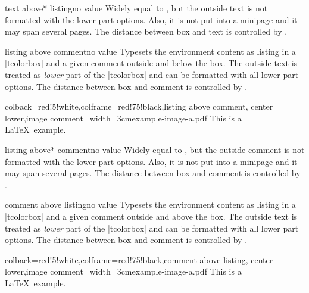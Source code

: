 \begin{docTcbKey}[][doc new=2014-11-07]{text above* listing}{}{no value}
  Widely equal to , but the outside text is
  not formatted with the lower part options.
  Also, it is not put into a minipage and it may span several pages.
  The distance between box and text is controlled by .
\end{docTcbKey}



\begin{docTcbKey}{listing above comment}{}{no value}
  Typesets the environment content as listing in a |tcolorbox|
  and a given comment outside and below the box.
  The outside text is treated as \emph{lower} part of the
  |tcolorbox| and can be formatted with all lower part options.
  The distance between box and comment is controlled by .
\begin{dispExample}
\begin{tcblisting}{colback=red!5!white,colframe=red!75!black,listing above comment,
  center lower,image comment={width=3cm}{example-image-a.pdf}}
This is a \LaTeX\ example.
\end{tcblisting}
\end{dispExample}
\end{docTcbKey}


\begin{docTcbKey}[][doc new=2014-11-07]{listing above* comment}{}{no value}
  Widely equal to , but the outside comment is
  not formatted with the lower part options.
  Also, it is not put into a minipage and it may span several pages.
  The distance between box and comment is controlled by .
\end{docTcbKey}

\clearpage

\begin{docTcbKey}{comment above listing}{}{no value}
  Typesets the environment content as listing in a |tcolorbox|
  and a given comment outside and above the box.
  The outside text is treated as \emph{lower} part of the
  |tcolorbox| and can be formatted with all lower part options.
  The distance between box and comment is controlled by .
\begin{dispExample}
\begin{tcblisting}{colback=red!5!white,colframe=red!75!black,comment above listing,
  center lower,image comment={width=3cm}{example-image-a.pdf}}
This is a \LaTeX\ example.
\end{tcblisting}
\end{dispExample}
\end{docTcbKey}


